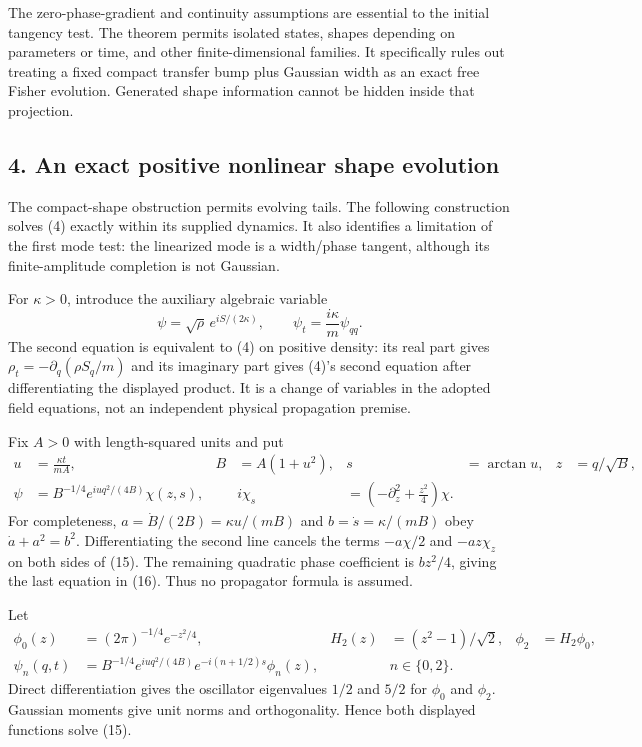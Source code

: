 \documentclass[11pt,a4paper]{article}
\begin{document}
The zero-phase-gradient and continuity assumptions are essential to the
initial tangency test. The theorem permits isolated states, shapes
depending on parameters or time, and other finite-dimensional families.
It specifically rules out treating a fixed compact transfer bump plus
Gaussian width as an exact free Fisher evolution. Generated shape
information cannot be hidden inside that projection.

\hypertarget{an-exact-positive-nonlinear-shape-evolution}{%
\subsection{4. An exact positive nonlinear shape
evolution}\label{an-exact-positive-nonlinear-shape-evolution}}

The compact-shape obstruction permits evolving tails. The following
construction solves (4) exactly within its supplied dynamics. It also
identifies a limitation of the first mode test: the linearized mode is a
width/phase tangent, although its finite-amplitude completion is not
Gaussian.

For \(\kappa>0\), introduce the auxiliary algebraic variable
\[\psi=\sqrt\rho\,e^{iS/(2\kappa)},\qquad
\psi_t=\frac{i\kappa}{m}\psi_{qq}.\tag{15}\] The second equation is
equivalent to (4) on positive density: its real part gives
\(\rho_t=-\partial_q(\rho S_q/m)\) and its imaginary part gives (4)'s
second equation after differentiating the displayed product. It is a
change of variables in the adopted field equations, not an independent
physical propagation premise.

Fix \(A>0\) with length-squared units and put \[\begin{aligned}
u&=\frac{\kappa t}{mA},&B&=A(1+u^2),&s&=\arctan u,&z&=q/\sqrt B,\\
\psi&=B^{-1/4}e^{iuq^2/(4B)}\chi(z,s),&&
i\chi_s&=\left(-\partial_z^2+\frac{z^2}{4}\right)\chi.
\end{aligned}\tag{16}\] For completeness,
\(a=\dot B/(2B)=\kappa u/(mB)\) and \(b=\dot s=\kappa/(mB)\) obey
\(\dot a+a^2=b^2\). Differentiating the second line cancels the terms
\(-a\chi/2\) and \(-az\chi_z\) on both sides of (15). The remaining
quadratic phase coefficient is \(bz^2/4\), giving the last equation in
(16). Thus no propagator formula is assumed.

Let \[\begin{aligned}
\phi_0(z)&=(2\pi)^{-1/4}e^{-z^2/4},&
H_2(z)&=(z^2-1)/\sqrt2,&\phi_2&=H_2\phi_0,\\
\psi_n(q,t)&=B^{-1/4}e^{iuq^2/(4B)}
 e^{-i(n+1/2)s}\phi_n(z),&&n\in\{0,2\}.
\end{aligned}\tag{17}\] Direct differentiation gives the oscillator
eigenvalues \(1/2\) and \(5/2\) for \(\phi_0\) and \(\phi_2\). Gaussian
moments give unit norms and orthogonality. Hence both displayed
functions solve (15).
\end{document}
